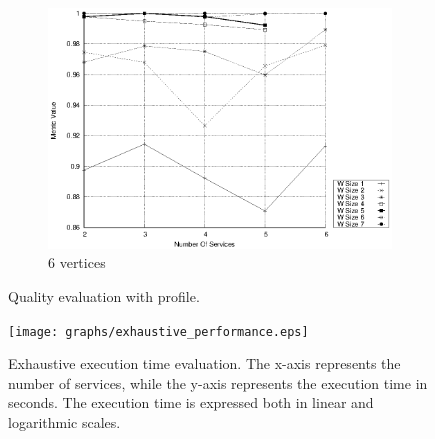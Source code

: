 \begin{figure}[h]
\begin{subfigure}{0.33\textwidth}
    \includegraphics[width=\textwidth]{Images/graphs/window_quality_performance_diff_qual_n7_s7_20_100_n7}
    \caption{6 vertices}
    \label{fig:quality_window_wide_qualitative_n7}
  \end{subfigure}

  \caption{ Quality evaluation with \wide profile.}
  \label{fig:quality_window_wide_qualitative}
\end{figure}


\begin{figure}
  \texttt{[image: graphs/exhaustive\_performance.eps]}
  \caption{Exhaustive execution time evaluation. The x-axis represents the number of services, while the y-axis represents the execution time in seconds. The execution time is expressed both in linear and logarithmic scales.}
  \label{fig:perf_exhaustive}
\end{figure}

